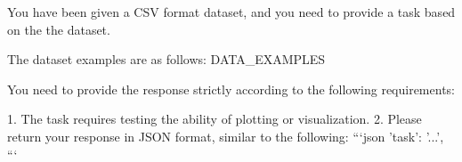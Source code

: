 
\begin{tcolorbox}[colback=cadmiumgreen!5!white,colframe=forestgreen!75!white,breakable,title=\textit{Prompt for task construction in visualization from data.}]
\begin{VerbatimWrap}
You have been given a CSV format dataset, and you need to provide a task based on the the dataset.

The dataset examples are as follows:
{{DATA_EXAMPLES}}

You need to provide the response strictly according to the following requirements:

1. The task requires testing the ability of plotting or visualization.
2. Please return your response in JSON format, similar to the following:
```json
{
    'task': '...',
}
```
\end{VerbatimWrap}
\end{tcolorbox}
